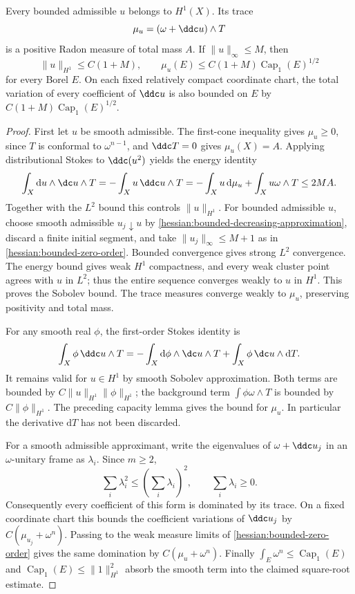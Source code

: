 \begin{lemma}\label{hessian:bounded-sobolev-trace}
Every bounded admissible $u$ belongs to $H^1(X)$. Its trace
\[
 \mu_u=(\omega+\ddc u)\wedge T
\]
is a positive Radon measure of total mass $A$. If $\|u\|_\infty\leq M$,
then
\[
 \|u\|_{H^1}\leq C(1+M),\qquad
 \mu_u(E)\leq C(1+M)\operatorname{Cap}_1(E)^{1/2}
\]
for every Borel $E$. On each fixed relatively compact coordinate chart,
the total variation of every coefficient of $\ddc u$ is also bounded
on $E$ by $C(1+M)\operatorname{Cap}_1(E)^{1/2}$.
\end{lemma}
\begin{proof}
First let $u$ be smooth admissible. The first-cone inequality gives
$\mu_u\geq0$, since $T$ is conformal to $\omega^{n-1}$, and
$\ddc T=0$ gives $\mu_u(X)=A$. Applying distributional Stokes to
$\ddc(u^2)$ yields the energy identity
\[
 \int_X\mathrm du\wedge\dc u\wedge T
   =-\int_Xu\,\ddc u\wedge T
   =-\int_Xu\,\mathrm d\mu_u+\int_Xu\omega\wedge T
   \leq2MA.
\]
Together with the $L^2$ bound this controls $\|u\|_{H^1}$.
For bounded admissible $u$, choose smooth admissible $u_j\downarrow u$
by \cref{hessian:bounded-decreasing-approximation}, discard a finite
initial segment, and take $\|u_j\|_\infty\leq M+1$ as in
\cref{hessian:bounded-zero-order}. Bounded convergence gives strong
$L^2$ convergence. The energy bound gives weak $H^1$ compactness, and
every weak cluster point agrees with $u$ in $L^2$; thus the entire
sequence converges weakly to $u$ in $H^1$. This proves the Sobolev bound.
The trace measures converge weakly to $\mu_u$, preserving positivity and total mass.

For any smooth real $\phi$, the first-order Stokes identity is
\[
 \int_X\phi\,\ddc u\wedge T
  =-\int_X\mathrm d\phi\wedge\dc u\wedge T
       +\int_X\phi\,\dc u\wedge\mathrm dT.
\]
It remains valid for $u\in H^1$ by smooth Sobolev approximation.
Both terms are bounded by $C\|u\|_{H^1}\|\phi\|_{H^1}$; the background term
$\int\phi\omega\wedge T$ is bounded by $C\|\phi\|_{H^1}$.
The preceding capacity lemma gives the bound for $\mu_u$.
In particular the derivative $\mathrm dT$ has not been discarded.

For a smooth admissible approximant, write the eigenvalues of
$\omega+\ddc u_j$ in an $\omega$-unitary frame as $\lambda_i$.
Since $m\geq2$,
\[
 \sum_i\lambda_i^2\leq\left(\sum_i\lambda_i\right)^2,
 \qquad \sum_i\lambda_i\geq0.
\]
Consequently every coefficient of this form is dominated by its trace.
On a fixed coordinate chart this bounds the coefficient variations of
$\ddc u_j$ by $C(\mu_{u_j}+\omega^n)$. Passing to the weak measure
limits of \cref{hessian:bounded-zero-order} gives the same domination
by $C(\mu_u+\omega^n)$. Finally
$\int_E\omega^n\leq\operatorname{Cap}_1(E)$ and
$\operatorname{Cap}_1(E)\leq\|1\|_{H^1}^2$ absorb the smooth term into the
claimed square-root estimate.
\end{proof}

